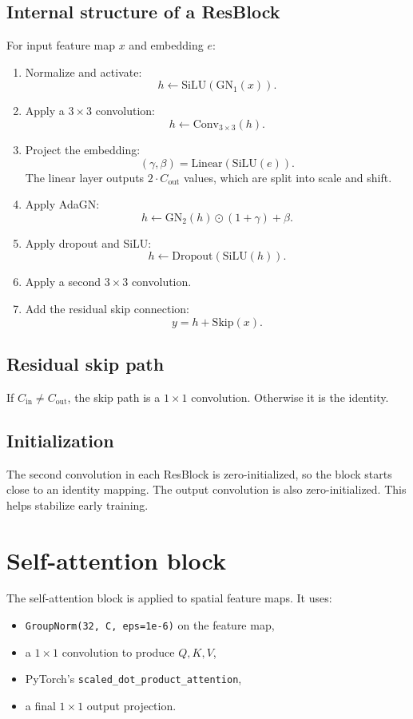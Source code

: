 \documentclass[11pt]{article}
\begin{document}
\subsection{Internal structure of a ResBlock}
For input feature map $x$ and embedding $e$:
\begin{enumerate}
  \item Normalize and activate:
  \[
  h \leftarrow \mathrm{SiLU}(\mathrm{GN}_1(x)).
  \]
  \item Apply a $3 \times 3$ convolution:
  \[
  h \leftarrow \mathrm{Conv}_{3 \times 3}(h).
  \]
  \item Project the embedding:
  \[
  (\gamma, \beta) = \mathrm{Linear}(\mathrm{SiLU}(e)).
  \]
  The linear layer outputs $2 \cdot C_{\mathrm{out}}$ values, which are split into scale and shift.
  \item Apply AdaGN:
  \[
  h \leftarrow \mathrm{GN}_2(h) \odot (1+\gamma) + \beta.
  \]
  \item Apply dropout and SiLU:
  \[
  h \leftarrow \mathrm{Dropout}(\mathrm{SiLU}(h)).
  \]
  \item Apply a second $3 \times 3$ convolution.
  \item Add the residual skip connection:
  \[
  y = h + \mathrm{Skip}(x).
  \]
\end{enumerate}

\subsection{Residual skip path}
If $C_{\mathrm{in}} \neq C_{\mathrm{out}}$, the skip path is a $1 \times 1$ convolution.
Otherwise it is the identity.

\subsection{Initialization}
The second convolution in each ResBlock is zero-initialized, so the block starts close to an identity mapping.
The output convolution is also zero-initialized. This helps stabilize early training.

\section{Self-attention block}
The self-attention block is applied to spatial feature maps. It uses:
\begin{itemize}
  \item \texttt{GroupNorm(32, C, eps=1e-6)} on the feature map,
  \item a $1 \times 1$ convolution to produce $Q,K,V$,
  \item PyTorch's \texttt{scaled\_dot\_product\_attention},
  \item a final $1 \times 1$ output projection.
\end{itemize}
\end{document}
